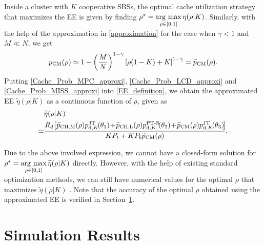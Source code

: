 \documentclass[twocolumns,10pt]{IEEEtran}
\newcommand{\argmax}{\mathop{\rm arg~max}\limits}
\begin{document}
Inside a cluster with $K$ cooperative SBSs, the optimal cache utilization strategy that maximizes the EE is given by finding $\rho^{*}= \argmax_{\rho \in[0,1] } \eta(\rho| K)$.
Similarly, with the help of the approximation in \eqref{approximation} for the case when $\gamma<1$ and $M\ll N$, we get
\begin{equation}
p_{\textnormal{CM}}(\rho)\simeq 1-\left(\frac{M}{N}\right)^{1-\gamma}\left[\rho(1-K)+K\right]^{1-\gamma} = \widetilde{p}_{\textnormal{CM}}(\rho) .
\label{Cache_Prob_MISS_approxi}
\end{equation}
Putting \eqref{Cache_Prob_MPC_approxi}, \eqref{Cache_Prob_LCD_approxi} and \eqref{Cache_Prob_MISS_approxi} into \eqref{EE_definition}, we obtain the approximated EE $\widetilde{\eta}(\rho| K)$ as a continuous function of $\rho$, given as
\begin{equation}
\begin{split}
& \widetilde{\eta}(\rho| K) \\
\simeq &\frac{R_d  \!\left[\widetilde{p}_{\textnormal{CH,M}} (\rho)p_{\textnormal{d},K}^{\textnormal{JT}}\!(\theta_1)  \!+ \! \widetilde{p}_{\textnormal{CH,L}}(\rho) p_{\textnormal{d},K}^{\textnormal{PT-S}}\!(\theta_2)   \!+ \! \widetilde{p}_{\textnormal{CM}}(\rho) p_{\textnormal{d},K}^{\textnormal{JT}}\!(\theta_3)\!\right] \!}{K P_t +K P_b \widetilde{p}_{\textnormal{CM}}(\rho)}.
\label{EE_approximate}
\end{split}
\end{equation}

Due to the above involved expression, we cannot have a closed-form solution for $\rho^{*}=\argmax_{\rho \in[0,1] } \widetilde{\eta}(\rho| K) $ directly. However, with the help of existing standard optimization methods, we can still have numerical values for the optimal $\rho$ that maximizes $\widetilde{\eta}(\rho| K) $ . Note that the accuracy of the optimal $\rho$ obtained using the approximated EE is verified in Section~\ref{sec:simulation}. 




\section{Simulation Results}\label{sec:simulation}
\label{simulation}
\end{document}

